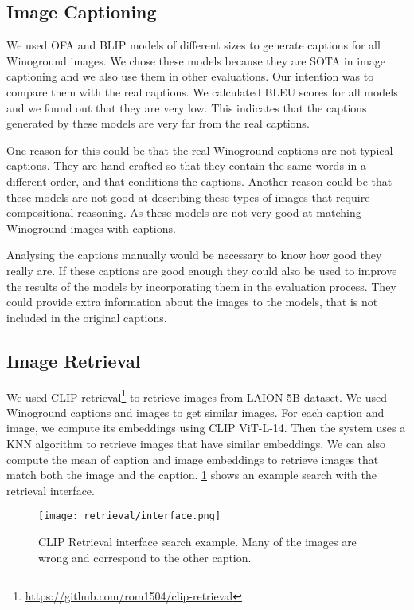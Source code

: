 \subsection{Image Captioning} \label{image_captioning}

We used OFA \cite{wang2022unifying} and BLIP \cite{li2022blip} models of different sizes to generate captions for all Winoground images. We chose these models because they are SOTA in image captioning and we also use them in other evaluations. Our intention was to compare them with the real captions. We calculated BLEU scores for all models and we found out that they are very low. This indicates that the captions generated by these models are very far from the real captions. 

One reason for this could be that the real Winoground captions are not typical captions. They are hand-crafted so that they contain the same words in a different order, and that conditions the captions. Another reason could be that these models are not good at describing these types of images that require compositional reasoning. As these models are not very good at matching Winoground images with captions.

Analysing the captions manually would be necessary to know how good they really are. If these captions are good enough they could also be used to improve the results of the models by incorporating them in the evaluation process. They could provide extra information about the images to the models, that is not included in the original captions.

\subsection{Image Retrieval} \label{image_retrieval}

We used CLIP retrieval\footnote{\url{https://github.com/rom1504/clip-retrieval}} to retrieve images from LAION-5B \cite{schuhmann2022laionb} dataset. We used Winoground captions and images to get similar images. For each caption and image, we compute its embeddings using CLIP ViT-L-14. Then the system uses a KNN algorithm to retrieve images that have similar embeddings. We can also compute the mean of caption and image embeddings to retrieve images that match both the image and the caption. \cref{fig:retrieval_interface} shows an example search with the retrieval interface.

\begin{figure}[ht]
    \centering
    \texttt{[image: retrieval/interface.png]}
    \caption{CLIP Retrieval interface search example. Many of the images are wrong and correspond to the other caption.}
    \label{fig:retrieval_interface}
\end{figure}

